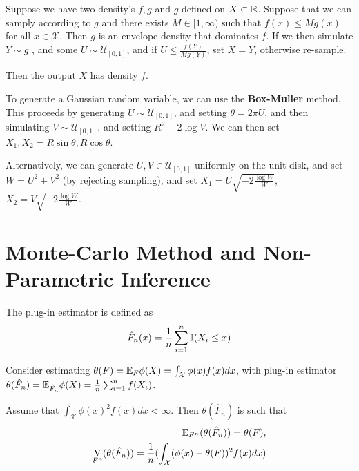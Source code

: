 \begin{thm}
  \label{sec:monte-carlo-5}
  Suppose we have two density's $f, g$ and $g$ defined on $X \subset
  \mathbb{R}$. Suppose that we can samply according to $g$ and there exists $M
  \in [1, \infty)$ such that $f(x) \leq M g(x)$ for all $x \in
  \mathcal{X}$. Then $g$ is an envelope density that dominates $f$. If
  we then simulate $Y \sim g$ , and some $U \sim \mathcal{U}_{[0,
    1]}$, and if $U \leq \frac{f(Y)}{Mg(Y)}$, set $X = Y$, otherwise
  re-sample.

  Then the output $X$ has density $f$.
\end{thm}

\begin{thm}
  \label{sec:monte-carlo-6}
  To generate a Gaussian random variable, we can use the
  \textbf{Box-Muller} method.  This proceeds by generating $U \sim
  \mathcal{U}_{[0, 1]}$, and setting $\theta = 2 \pi U$, and then
  simulating $V \sim \mathcal{U}_{[0, 1]}$, and setting $R^{2} - 2
  \log V$.  We can then set $X_{1}, X_{2} = R \sin \theta, R \cos
  \theta$.

  Alternatively, we can generate $U, V \in \mathcal{U}_{[0, 1]}$
  uniformly on the unit disk, and set $W = U^{2} + V^{2}$ (by
  rejecting sampling), and set $X_{1} = U \sqrt{-2 \frac{\log W}{W}
  }$, $X_{2} = V \sqrt{-2 \frac{\log W}{W}}$.
\end{thm}

\section{Monte-Carlo Method and Non-Parametric Inference}
\label{sec:monte-carlo-method}

\begin{defn}
  \label{sec:monte-carlo-method-1}
  The plug-in estimator is defined as
  \begin{equation}
    \hat F_{n}(x) = \frac{1}{n} \sum_{i=1}^{n} \I{X_{i} \leq x}
  \end{equation}
\end{defn}

\begin{thm}
  \label{sec:monte-carlo-method-2}
  Consider estimating $\theta(F) = \E_{F} \phi(X) =
  \int_{\mathcal{X}}^{} \phi(x) f(x) dx$, with plug-in estimator
  $\theta(\hat F_{n}) = \E_{\hat F_{n}} \phi(X) = \frac{1}{n}
  \sum_{i=1}^{n} f(X_{i})$.

  Assume that $\int_{\mathcal{X}} \phi(x)^{2} f(x) dx < \infty$.  Then
  $\theta(\hat F_{n})$ is such that
  \begin{align}
    \label{eq:1}
    \E_{F^{n}}(\theta(\hat F_{n})) = \theta(F), \\
    \label{eq:2}
    \V_{F^{n}}(\theta(\hat F_{n})) = \frac{1}{n} (\int_{\mathcal{X}}
    (\phi(x) - \theta(F))^{2} f(x) dx)
  \end{align}
\end{thm}


